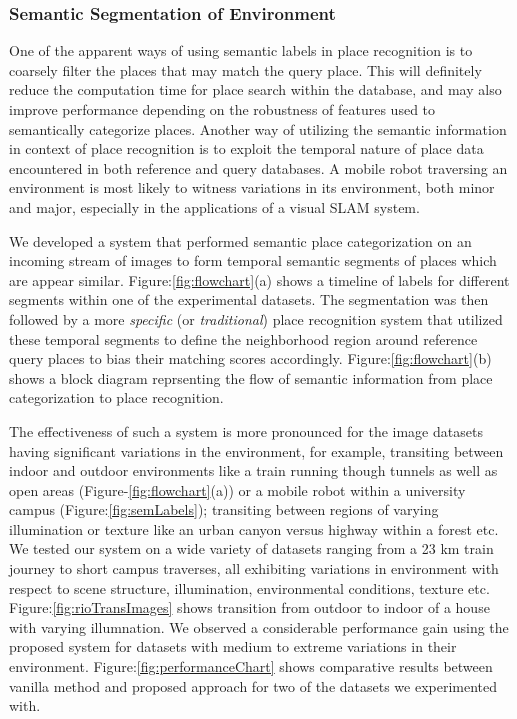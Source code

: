 \documentclass{article}
\begin{document}
\subsubsection{Semantic Segmentation of Environment}
One of the apparent ways of using semantic labels in place recognition is to coarsely filter the places that may match the query place. This will definitely reduce the computation time for place search within the database, and may also improve performance depending on the robustness of features used to semantically categorize places. Another way of utilizing the semantic information in context of place recognition is to exploit the temporal nature of place data encountered in both reference and query databases. A mobile robot traversing an environment is most likely to witness variations in its environment, both minor and major, especially in the applications of a visual SLAM system. 

We developed a system that performed semantic place categorization on an incoming stream of images to form temporal semantic segments of places which are appear similar. Figure:\ref{fig:flowchart}(a) shows a timeline of labels for different segments within one of the experimental datasets. The segmentation was then followed by a more \emph{specific} (or \emph{traditional}) place recognition system that utilized these temporal segments to define the neighborhood region around reference query places to bias their matching scores accordingly. Figure:\ref{fig:flowchart}(b) shows a block diagram reprsenting the flow of semantic information from place categorization to place recognition. 

The effectiveness of such a system is more pronounced for the image datasets having significant variations in the environment, for example, transiting between indoor and outdoor environments like a train running though tunnels as well as open areas (Figure-\ref{fig:flowchart}(a)) or a mobile robot within a university campus (Figure:\ref{fig:semLabels}); transiting between regions of varying illumination or texture like an urban canyon versus highway within a forest etc. We tested our system on a wide variety of datasets ranging from a 23 km train journey to short campus traverses, all exhibiting variations in environment with respect to scene structure, illumination, environmental conditions, texture etc. Figure:\ref{fig:rioTransImages} shows transition from outdoor to indoor of a house with varying illumnation. We observed a considerable performance gain using the proposed system for datasets with medium to extreme variations in their environment. Figure:\ref{fig:performanceChart} shows comparative results between vanilla method and proposed approach for two of the datasets we experimented with.
\end{document}

